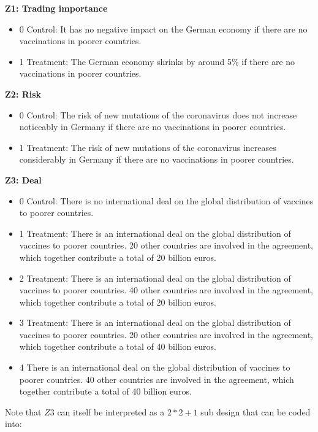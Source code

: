 \documentclass[]{article}
\begin{document}
\textbf{Z1: Trading importance}

\begin{itemize}
	\item
	0 Control: It has no negative impact on the German economy if there
	are no vaccinations in poorer countries.
	\item
	1 Treatment: The German economy shrinks by around 5\% if there are no
	vaccinations in poorer countries.
\end{itemize}

\textbf{Z2: Risk}

\begin{itemize}
	\item
	0 Control: The risk of new mutations of the coronavirus does not
	increase noticeably in Germany if there are no vaccinations in poorer
	countries.
	\item
	1 Treatment: The risk of new mutations of the coronavirus increases
	considerably in Germany if there are no vaccinations in poorer
	countries.
\end{itemize}

\textbf{Z3: Deal}

\begin{itemize}
	\item
	0 Control: There is no international deal on the global distribution
	of vaccines to poorer countries.
	\item
	1 Treatment: There is an international deal on the global distribution
	of vaccines to poorer countries. 20 other countries are involved in
	the agreement, which together contribute a total of 20 billion euros.
	\item
	2 Treatment: There is an international deal on the global distribution
	of vaccines to poorer countries. 40 other countries are involved in
	the agreement, which together contribute a total of 20 billion euros.
	\item
	3 Treatment: There is an international deal on the global distribution
	of vaccines to poorer countries. 20 other countries are involved in
	the agreement, which together contribute a total of 40 billion euros.
	\item
	4 There is an international deal on the global distribution of
	vaccines to poorer countries. 40 other countries are involved in the
	agreement, which together contribute a total of 40 billion euros.
\end{itemize}

Note that \(Z3\) can itself be interpreted as a \(2*2+1\) sub design
that can be coded into:
\end{document}
